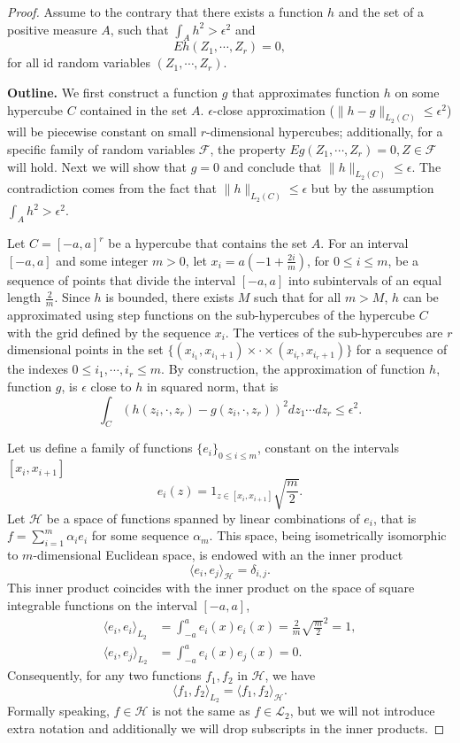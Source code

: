 \documentclass{article}
\begin{document}
\begin{proof}
Assume to the contrary that there exists a function $h$ and the set of a positive measure $A$, such that $\int_{A} h^2 > \epsilon^2$ and   
$$
E h(Z_1,\cdots,Z_r) = 0,
$$
for all id random variables $(Z_1,\cdots,Z_r)$.

\textbf{Outline.} We first construct a function $g$ that  approximates function $h$ on some hypercube $C$ contained in  the set $A$.  $\epsilon$-close approximation ($\| h-g\|_{L_2(C)} \leq \epsilon^2$) will be piecewise constant on small  $r$-dimensional hypercubes; additionally, for a specific family of random variables $\mathcal{F}$, the property $E g(Z_1,\cdots,Z_r)=0, Z \in \mathcal{F}$ will hold. Next we will show that $g=0$ and conclude that $\| h\|_{L_2(C)}\leq \epsilon$. The contradiction comes from the fact that $\| h\|_{L_2(C)}\leq \epsilon$ but by the assumption $\int_{A} h^2 > \epsilon^2$.  

Let $C=[-a,a]^r$ be a hypercube that contains the set $A$. For an interval $[-a,a]$ and some integer $m>0$, let $x_i = a(-1 + \frac{2i}{m})$, for $0 \leq i \leq m$, be a sequence of points that divide the interval $[-a,a]$ into subintervals of an equal length $\frac{2}{m}$. Since $h$ is bounded, there exists $M$ such that for all $m>M$, $h$ can be approximated using step functions on the sub-hypercubes of the hypercube $C$ with the grid defined by the sequence $x_i$. The vertices of the sub-hypercubes are $r$ dimensional points in the set  $\{ (x_{i_1},x_{i_1+1}) \times \cdot \times (x_{i_r},x_{i_r+1})\}$ for a sequence of the indexes $0 \leq i_1, \cdots, i_r\leq m$. By construction, the approximation of function  $h$,  function $g$, is $\epsilon$ close to $h$ in squared norm, that is
 \[
  \int_{C} \left( h(z_i,\cdot,z_r) -g(z_i,\cdot,z_r) \right)^2 d z_1 \cdots d z_r \leq \epsilon^2.
 \]
 
 
Let us define a family of functions $\{e_i\}_{0\leq i \leq m}$, constant on the intervals $[x_i,x_{i+1}]$
\[
e_i(z) = 1_{z \in [x_i,x_{i+1}]} \sqrt{\frac{m}{2}}.
\]
Let $\mathcal H$ be a space of functions spanned by linear combinations of $e_i$, that is  $f = \sum_{i=1}^{m} \alpha_i e_i$ for some sequence $\alpha_m$. This space, being isometrically isomorphic to $m$-dimensional Euclidean space,  is endowed with an the inner product 
\[
\langle e_i,e_j \rangle_{\mathcal H} = \delta_{i,j}.
\]
This inner product coincides with the inner product on the space of square integrable functions on the interval $[-a,a]$, 
\begin{align}
\langle e_i,e_i \rangle_{L_2} &= \int_{-a}^{a} e_i(x) e_i(x) = \frac{2}{m} \sqrt{\frac m 2}^2 =1,  \\ 
\langle e_i,e_j \rangle_{L_2} &= \int_{-a}^{a} e_i(x) e_j(x) = 0. 
\end{align}
Consequently, for any two functions $f_1,f_2$ in $\mathcal{H}$, we have 
\[
\langle f_1,f_2 \rangle_{L_2} =  \langle f_1,f_2 \rangle_{\mathcal{H}}.
\]
Formally speaking, $f \in \mathcal{H}$ is not the same as $f \in \mathcal L_2$, but we will not  introduce extra notation and additionally  we will drop subscripts in the inner products. 


\end{proof}
\end{document}
